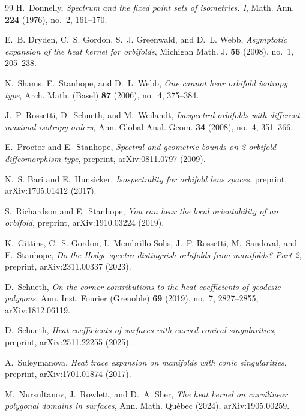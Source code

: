 \documentclass[12pt, letterpaper]{article}
\theoremstyle{definition}
\theoremstyle{plain}
\begin{document}
\begin{thebibliography}{99}
H.~Donnelly, \emph{Spectrum and the fixed point sets of isometries. I}, Math. Ann. \textbf{224} (1976), no.~2, 161--170.

E.~B. Dryden, C.~S. Gordon, S.~J. Greenwald, and D.~L. Webb, \emph{Asymptotic expansion of the heat kernel for orbifolds}, Michigan Math. J. \textbf{56} (2008), no.~1, 205--238.

N.~Shams, E.~Stanhope, and D.~L. Webb, \emph{One cannot hear orbifold isotropy type}, Arch. Math. (Basel) \textbf{87} (2006), no.~4, 375--384.

J.~P. Rossetti, D.~Schueth, and M.~Weilandt, \emph{Isospectral orbifolds with different maximal isotropy orders}, Ann. Global Anal. Geom. \textbf{34} (2008), no.~4, 351--366.

E.~Proctor and E.~Stanhope, \emph{Spectral and geometric bounds on 2-orbifold diffeomorphism type}, preprint, arXiv:0811.0797 (2009).

N.~S. Bari and E.~Hunsicker, \emph{Isospectrality for orbifold lens spaces}, preprint, arXiv:1705.01412 (2017).

S.~Richardson and E.~Stanhope, \emph{You can hear the local orientability of an orbifold}, preprint, arXiv:1910.03224 (2019).

K.~Gittins, C.~S. Gordon, I.~Membrillo Solis, J.~P. Rossetti, M.~Sandoval, and E.~Stanhope, \emph{Do the Hodge spectra distinguish orbifolds from manifolds? Part 2}, preprint, arXiv:2311.00337 (2023).

D.~Schueth, \emph{On the corner contributions to the heat coefficients of geodesic polygons}, Ann. Inst. Fourier (Grenoble) \textbf{69} (2019), no.~7, 2827--2855, arXiv:1812.06119.

D.~Schueth, \emph{Heat coefficients of surfaces with curved conical singularities}, preprint, arXiv:2511.22255 (2025).

A.~Suleymanova, \emph{Heat trace expansion on manifolds with conic singularities}, preprint, arXiv:1701.01874 (2017).

M.~Nursultanov, J.~Rowlett, and D.~A. Sher, \emph{The heat kernel on curvilinear polygonal domains in surfaces}, Ann. Math. Qu\'ebec (2024), arXiv:1905.00259.


\end{thebibliography}
\end{document}

